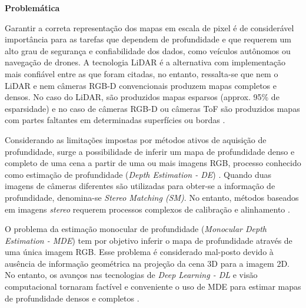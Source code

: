 

\textbf{Problemática} 

Garantir a correta representação dos mapas em escala de pixel é de considerável importância para as tarefas que dependem de profundidade e que requerem um alto grau de segurança e confiabilidade dos dados, como veículos autônomos ou navegação de drones. A tecnologia LiDAR é a alternativa com implementação mais confiável entre as que foram citadas, no entanto, ressalta-se que nem o LiDAR e nem câmeras RGB-D convencionais produzem mapas completos e densos. No caso do LiDAR, são produzidos mapas esparsos (approx. 95\% de esparsidade) e no caso de câmeras RGB-D ou câmeras ToF são produzidos mapas com partes faltantes em determinadas superfícies ou bordas \cite{hu2012robust}. 







Considerando as limitações impostas por métodos ativos de aquisição de profundidade, surge a possibilidade de inferir um mapa de profundidade denso e completo de uma cena a partir de uma ou mais imagens RGB, processo conhecido como estimação de profundidade (\textit{Depth Estimation - DE}) \cite{rajapaksha2024deep}. Quando duas imagens de câmeras diferentes são utilizadas para obter-se a informação de profundidade, denomina-se \textit{Stereo Matching (SM)}. No entanto, métodos baseados em imagens \textit{stereo} requerem processos complexos de calibração e alinhamento \cite{dong2022towards}.


O problema da estimação monocular de profundidade (\textit{Monocular Depth Estimation - MDE}) tem por objetivo inferir o mapa de profundidade através de uma única imagem RGB. Esse problema é considerado mal-posto devido à ausência de informação geométrica na projeção da cena 3D para a imagem 2D. No entanto, os avanços nas tecnologias de \textit{Deep Learning - DL} e visão computacional tornaram factível e conveniente o uso de MDE para estimar mapas de profundidade densos e completos \cite{spencer2024third} \cite{rajapaksha2024deep}. 


